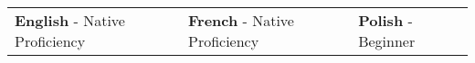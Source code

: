 \begin{tabularx}{\linewidth}{@{}XXX@{}}
    \textbf{English} - Native Proficiency &
    \textbf{French} - Native Proficiency &
    \textbf{Polish} - Beginner \\ 
\end{tabularx}
